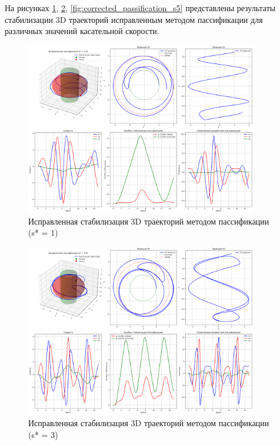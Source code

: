 На рисунках \ref{fig:corrected_passification_s1}, \ref{fig:corrected_passification_s3}, \ref{fig:corrected_passification_s5} представлены результаты стабилизации 3D траекторий исправленным методом пассификации для различных значений касательной скорости.

\begin{figure}[H]
\centering
\includegraphics[width=0.9\textwidth]{images/task3/corrected_passification_s1.0.png}
\caption{Исправленная стабилизация 3D траекторий методом пассификации (s* = 1)}
\label{fig:corrected_passification_s1}
\end{figure}

\begin{figure}[H]
\centering
\includegraphics[width=0.9\textwidth]{images/task3/corrected_passification_s3.0.png}
\caption{Исправленная стабилизация 3D траекторий методом пассификации (s* = 3)}
\label{fig:corrected_passification_s3}
\end{figure}

